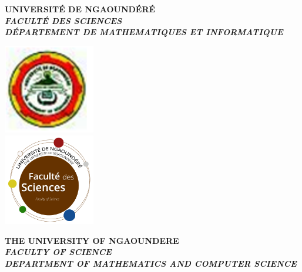 \begin{titlepage}
\begin{center}


\begin{minipage}{0.38\textwidth}
\begin{centering} 
\bf{UNIVERSITÉ DE NGAOUNDÉRÉ}\\[0.2cm]
\bf{\it{FACULTÉ DES SCIENCES}}\\[0.2cm]
\bf{\it{DÉPARTEMENT DE MATHEMATIQUES ET INFORMATIQUE}}\\[0.2cm]
\end{centering}
\end{minipage}
\begin{minipage}{0.20\textwidth}
	\centering
	\includegraphics[width=0.30\textwidth]{./LogoUnivNg}\\
	\includegraphics[width=0.30\textwidth]{./LogoUnivNgFS}
	
\end{minipage}
\begin{minipage}{0.38\textwidth}
\begin{centering} 
\bf{THE UNIVERSITY OF NGAOUNDERE}\\[0.2cm]
\bf{\it{FACULTY OF SCIENCE}}\\[0.2cm]
\bf{\it{{DEPARTMENT OF MATHEMATICS AND COMPUTER SCIENCE}}}\\[0.2cm]
\end{centering}
\end{minipage}\\[1.5cm]


\end{center}
\end{titlepage}
